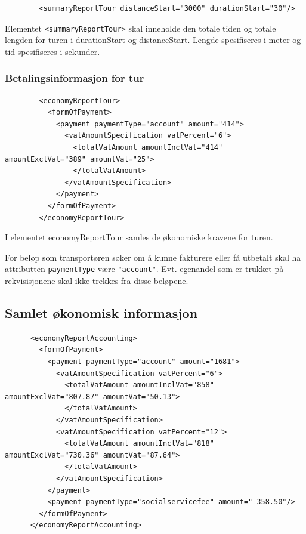 \documentclass[a4paper,titlepage,norsk,11pt]{article}
\begin{document}
\begin{lstlisting}
        <summaryReportTour distanceStart="3000" durationStart="30"/>
\end{lstlisting}

Elementet \lstinline{<summaryReportTour>} skal inneholde den totale tiden og totale lengden for turen i durationStart og distanceStart. Lengde spesifiseres i meter og tid spesifiseres i sekunder.

\subsubsection{Betalingsinformasjon for tur}

\begin{lstlisting}
        <economyReportTour>
          <formOfPayment>
            <payment paymentType="account" amount="414">
              <vatAmountSpecification vatPercent="6">
                <totalVatAmount amountInclVat="414" amountExclVat="389" amountVat="25">
                </totalVatAmount>
              </vatAmountSpecification>
            </payment>
          </formOfPayment>
        </economyReportTour>
\end{lstlisting}

I elementet economyReportTour samles de økonomiske kravene for turen.

For beløp som transportøren søker om å kunne fakturere eller få utbetalt skal ha attributten \lstinline{paymentType} være \lstinline{"account"}. Evt. egenandel som er trukket på rekvisisjonene skal ikke trekkes fra disse beløpene.

\subsection{Samlet økonomisk informasjon}

\begin{lstlisting}
      <economyReportAccounting>
        <formOfPayment>
          <payment paymentType="account" amount="1681">
            <vatAmountSpecification vatPercent="6">
              <totalVatAmount amountInclVat="858" amountExclVat="807.87" amountVat="50.13">
              </totalVatAmount>
            </vatAmountSpecification>
            <vatAmountSpecification vatPercent="12">
              <totalVatAmount amountInclVat="818" amountExclVat="730.36" amountVat="87.64">
              </totalVatAmount>
            </vatAmountSpecification>
          </payment>
          <payment paymentType="socialservicefee" amount="-358.50"/>
        </formOfPayment>
      </economyReportAccounting>
\end{lstlisting}
\end{document}
